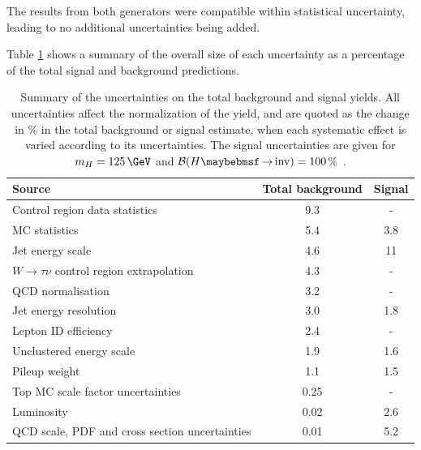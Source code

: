 The results from both generators were compatible within statistical uncertainty, leading to no additional uncertainties being added. 

Table \ref{TABLE:ParkedDataAnalysis_Systematics_Summary} shows a summary of the overall size of each uncertainty as a percentage of the total signal and background predictions.

\begin{table}[!htb]
\centering
\begin{tabular}{|l|c|c|}
\hline 
Source                                            & Total background &     Signal \\
\hline\hline
Control region data statistics                     &            9.3  &          - \\
MC statistics                                      &            5.4  &        3.8 \\
Jet energy scale                                   &            4.6  &         11 \\
$W\rightarrow\tau\nu$ control region extrapolation &            4.3  &          - \\
QCD normalisation                                  &            3.2  &          - \\
Jet energy resolution                              &            3.0  &        1.8 \\
Lepton ID efficiency                               &            2.4  &          - \\
Unclustered energy scale                           &            1.9  &        1.6 \\
Pileup weight                                      &            1.1  &        1.5 \\
Top MC scale factor uncertainties                  &            0.25 &          - \\
Luminosity                                         &            0.02 &        2.6 \\
QCD scale, PDF and cross section uncertainties     &            0.01 &        5.2 \\
\hline
\end{tabular}
\caption[Summary of the uncertainties on the total background and signal yields.]
{Summary of the uncertainties on the total background and signal yields. All uncertainties affect the normalization of the yield, and are quoted as the change in \% in the total background or signal estimate, when each systematic effect is varied according to its uncertainties. The signal uncertainties are given for $m_H=125\,\GeV$ and $\BRinv=100$\%~\cite{ARTICLE:CMSVBFHiggsInvisibleParkedAnalysisPAS}.}
\label{TABLE:ParkedDataAnalysis_Systematics_Summary}
\end{table}

